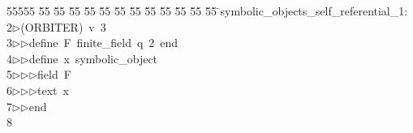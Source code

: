 %
%
\begin{tabbing}
55555 \= 55 \= 55 \= 55 \= 55 \= 55 \= 55 \= 55 \= 55 \= 55 \= 55 \= 55 \= 55 \= \>symbolic\_objects\_self\_referential\_1:\\[0pt]
2\>$\triangleright$\>(ORBITER)\ v\ 3\ \\[0pt]
3\>$\triangleright$\>$\triangleright$\>define\ F\ finite\_field\ q\ 2\ end\ \\[0pt]
4\>$\triangleright$\>$\triangleright$\>define\ x\ symbolic\_object\ \\[0pt]
5\>$\triangleright$\>$\triangleright$\>$\triangleright$\>field\ F\ \\[0pt]
6\>$\triangleright$\>$\triangleright$\>$\triangleright$\>text\ x\\[0pt]
7\>$\triangleright$\>$\triangleright$\>end\\[0pt]
8\>\end{tabbing}
